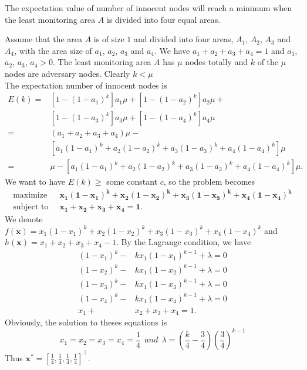 \documentclass[conference]{IEEEtran}
\newenvironment{proof}[1][Proof]{\begin{trivlist}
\item[\hskip \labelsep {\bfseries #1}]}{\end{trivlist}}
\newenvironment{claim}[1][Claim]{\begin{trivlist}
\item[\hskip \labelsep {\bfseries #1}]}{\end{trivlist}}
\begin{document}
\begin{claim}
The expectation value of number of innocent nodes will reach a minimum when the least monitoring area $A$ is divided into four equal areas.
\end{claim}

\begin{proof}
Assume that the area $A$ is of size $1$ and divided into four areas, $A_1$, $A_2$, $A_3$ and $A_4$, with the area size of $a_1$, $a_2$, $a_3$ and $a_4$. We have $a_1+a_2+a_3+a_4=1$ and $a_1$, $a_2$, $a_3$, $a_4 > 0$. The least monitoring area $A$ has $\mu$ nodes totally and $k$ of the $\mu$ nodes are adversary nodes. Clearly $k < \mu$\\
The expectation number of innocent nodes is 
\begin{subequations}
\begin{align*}
E(k)= &[1-(1-a_1 )^k]a_1 \mu +[1-(1-a_2 )^k]a_2 \mu + \\
      &[1-(1-a_3 )^k]a_3 \mu +[1-(1-a_4 )^k]a_4 \mu \\
= & (a_1 +a_2 +a_3 +a_4)\mu - \\
  &[a_1 (1-a_1 )^k +a_2 (1-a_2 )^k +a_3 (1-a_3 )^k +a_4 (1-a_4 )^k ]\mu \\
= & \mu-[a_1 (1-a_1 )^k +a_2 (1-a_2 )^k +a_3 (1-a_3 )^k +a_4 (1-a_4 )^k ]\mu.
\end{align*}
\end{subequations}
We want to have $E(k)\geq$ some constant $c$, so the problem becomes
\begin{subequations}
\begin{align*}
\mbox{maximize  }&~\mathbf{x_1 (1-x_1 )^k +x_2 (1-x_2 )^k +x_3 (1-x_3 )^k +x_4 (1-x_4 )^k} \\
\mbox{subject to  }&~\mathbf{x_1 +x_2 +x_3 +x_4 = 1}.
\end{align*}
\end{subequations}
We denote $f(\mathbf{x})=x_1 (1-x_1 )^k +x_2 (1-x_2 )^k +x_3 (1-x_3 )^k +x_4 (1-x_4 )^k$ and $h(\mathbf{x})=x_1+x_2+x_3+x_4-1$. By the Lagrange condition, we have
\begin{subequations}
\begin{align*}
(1-x_1)^k -&kx_1(1-x_1)^{k-1} + \lambda = 0 \\
(1-x_2)^k -&kx_1(1-x_2)^{k-1} + \lambda = 0 \\
(1-x_3)^k -&kx_1(1-x_3)^{k-1} + \lambda = 0 \\
(1-x_4)^k -&kx_1(1-x_4)^{k-1} + \lambda = 0 \\
x_1 +&x_2+x_3 +x_4 = 1.
\end{align*}
\end{subequations}
Obviously, the solution to theses equations is 
\[
x_1=x_2=x_3=x_4=\dfrac{1}{4}~~and~~\lambda=(\dfrac{k}{4}-\dfrac{3}{4})(\dfrac{3}{4})^{k-1}
\]
Thus $\mathbf{x^{\ast}}=[\frac{1}{4},\frac{1}{4},\frac{1}{4},\frac{1}{4}]^{\top}.$  



\end{proof}
\end{document}
